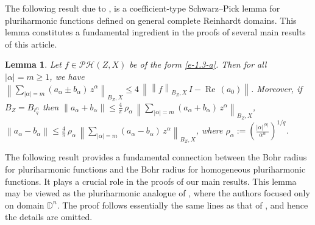 \documentclass[a4paper,11pt, reqno]{amsart}
\newtheorem{lem}{Lemma}[section]
\theoremstyle{definition}
\newcommand{\real}{{\operatorname{Re}\,}}
\newcommand{\norm}[1]{\left\lVert#1\right\rVert}
\newcommand{\comment}[1]{}
\begin{document}
The following result due to \cite{Himadri-local-Banach-1}, is a coefficient-type Schwarz–Pick lemma for pluriharmonic functions defined on general complete Reinhardt domains. This lemma constitutes a fundamental ingredient in the proofs of several main results of this article.
\begin{lem} \cite{Himadri-local-Banach-1}\label{lem-3.1} 
	Let $f \in \mathcal{PH}(Z,X)$ be of the form \eqref{e-1.3-a}. Then for all $|\alpha|=m\geq 1$, we have $\norm{\sum_{|\alpha|=m}(a_{\alpha} \pm b_{\alpha})\, z^{\alpha}}_{B_{Z},X} \leq 4 \,\norm{\norm{f}_{B_{Z},X}\,I-\real(a_{0})}$. Moreover, if $B_{Z}=B_{\ell^n_{q}}$ then $\norm{a_{\alpha}+b_{\alpha}}	\leq \frac{4}{\pi} \, \rho_{\alpha}\, \norm{\sum_{|\alpha|=m}(a_{\alpha}+b_{\alpha})\, z^{\alpha}}_{B_{Z},X}$,  $\norm{a_{\alpha}-b_{\alpha}}	\leq \frac{4}{\pi}\,\rho_{\alpha}\, \norm{\sum_{|\alpha|=m}(a_{\alpha}-b_{\alpha})\, z^{\alpha}}_{B_{Z},X}$, where $\rho_{\alpha}:=\left(\frac{|\alpha|^{|\alpha|}}{\alpha^{\alpha}}\right)^{1/q}$.
	\comment{\begin{enumerate}
			\item $\norm{\sum_{|\alpha|=m}(a_{\alpha}+b_{\alpha})\, z^{\alpha}}_{B_{Z},X} \leq 4 \,\gamma_{0} \norm{f}_{B_{Z},X}$,
			$\norm{\sum_{|\alpha|=m}(a_{\alpha}-b_{\alpha})\, z^{\alpha}}_{B_{Z},X} \leq 4 \, \gamma_{0}\, \norm{f}_{B_{Z},X}$;
			\item $\norm{a_{\alpha}+b_{\alpha}}	\leq \frac{4}{\pi} \, \rho_{\alpha}\, \norm{\sum_{|\alpha|=m}(a_{\alpha}+b_{\alpha})\, z^{\alpha}}_{B_{Z},X}$,  $\norm{a_{\alpha}-b_{\alpha}}	\leq \frac{4}{\pi}\,\rho_{\alpha}\, \norm{\sum_{|\alpha|=m}(a_{\alpha}-b_{\alpha})\, z^{\alpha}}_{B_{Z},X}$,
		\end{enumerate}
		where $\gamma_{0}:=\norm{I-\real(a_{0})}$ and $\rho_{\alpha}:=\left(\frac{|\alpha|^{|\alpha|}}{\alpha^{\alpha}}\right)^{\frac{1}{q}}$.}
\end{lem}
The following result provides a fundamental connection between the Bohr radius for pluriharmonic functions and the Bohr radius for homogeneous pluriharmonic functions. It plays a crucial role in the proofs of our main results. This lemma may be viewed as the pluriharmonic analogue of \cite[Lemma 3.2]{defant-2012}, where the authors focused only on domain $\mathbb{D}^n$. The proof follows essentially the same lines as that of \cite[Lemma 3.2]{defant-2012}, and hence the details are omitted.
\end{document}
